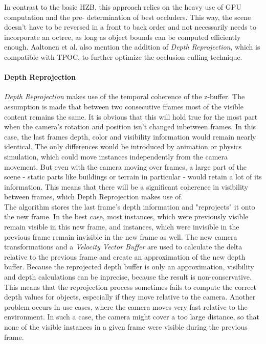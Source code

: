 \noindent
In contrast to the basic \ac{HZB}, this approach relies on the heavy use of \ac{GPU} computation and the pre-
determination of best occluders. This way, the scene doesn't have to be reversed in a front to back order and 
not necessarily needs to incorporate an octree, as long as object bounds can be computed efficiently enough.
Aaltonen et al. \cite{Aaltonen2015} also mention the addition of \emph{Depth Reprojection}, which is compatible 
with \ac{TPOC}, to further optimize the occlusion culling technique.


\paragraph*{Depth Reprojection} \label{subsubsec-depth-reprojection}

\emph{Depth Reprojection} makes use of the temporal coherence of the z-buffer. The assumption is made that 
between two consecutive frames most of the visible content remains the same. It is obvious that this will 
hold true for the most part when the camera's rotation and position isn't changed inbetween frames. In this case, 
the last frames depth, color and visibility information would remain nearly identical. The only differences would 
be introduced by animation or physics simulation, which could move instances independently from the camera movement.
But even with the camera moving over frames, a large part of the scene - static parts like buildings or terrain in 
particular - would retain a lot of its information. This means that there will be a significant coherence in 
visibility between frames, which Depth Reprojection makes use of.\\

\noindent
The algorithm stores the last frame's depth information and "reprojects" it onto the new frame. In the best case, 
most instances, which were previously visible remain visible in this new frame, and instances, which were invisible 
in the previous frame remain invisible in the new frame as well. The new camera transformations and a 
\emph{Velocity Vector Buffer} are used to calculate the delta relative to the previous frame and create an 
approximation of the new depth buffer. Because the reprojected depth buffer is only an approximation, visibility 
and depth calculations can be inprecise, because the result is non-conservative. This means that the reprojection 
process sometimes fails to compute the correct depth values for objects, especially if they move relative to the 
camera. Another problem occurs in use cases, where the camera moves very fast relative to the environment. In such 
a case, the camera might cover a too large distance, so that none of the visible instances in a given frame were 
visible during the previous frame. \cite{Kruskonja2022} \\



